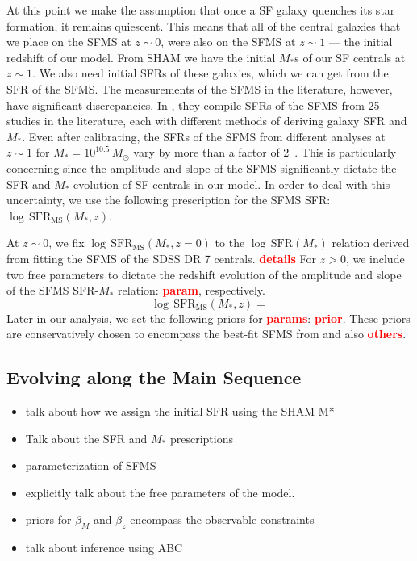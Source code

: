 \documentclass[12pt, letterpaper, preprint]{aastex}
\newcommand{\todo}[1]{{\bf \textcolor{red}{#1}}}
\newcommand{\beq}{\begin{equation}}
\newcommand{\eeq}{\end{equation}}
\newcommand{\bitem}{\begin{itemize}}
\newcommand{\eitem}{\end{itemize}}
\begin{document}
At this point we make the assumption that once a SF galaxy quenches 
its star formation, it remains quiescent. This means that all of the 
central galaxies that we place on the SFMS at $z \sim 0$, were also 
on the SFMS at $z \sim 1$ --- the initial redshift of our model. From 
SHAM we have the initial $M_*$s of our SF centrals at $z \sim 1$. We 
also need initial SFRs of these galaxies, which we can get from the 
SFR of the SFMS. The measurements of the SFMS in the literature, however,
have significant discrepancies. In \cite{speagle2014}, they compile 
SFRs of the SFMS from 25 studies in the literature, each with different 
methods of deriving galaxy SFR and $M_*$. Even after calibrating, the 
SFRs of the SFMS from different analyses at $z \sim 1$ for $M_* = 10^{10.5}\, M_\odot$ 
vary by more than a factor of 2~\citep[see Figure 2 of][]{speagle2014}. 
This is particularly concerning since the amplitude and slope of the SFMS 
significantly dictate the SFR and $M_*$ evolution of SF centrals in our 
model. In order to deal with this uncertainty, we use the following 
prescription for the SFMS SFR: $\log\,\mathrm{SFR}_\mathrm{MS}(M_*, z)$. 

At $z \sim 0$, we fix $\log\,\mathrm{SFR}_\mathrm{MS}(M_*, z=0)$ to the 
$\log\, \mathrm{SFR}(M_*)$ relation derived from fitting the SFMS 
of the SDSS DR 7 centrals. \todo{details} 
For $z > 0$, we include two free parameters to dictate the redshift
evolution of the amplitude and slope of the SFMS SFR-$M_*$ relation: 
\todo{param}, respectively. 
\beq
\log\,\mathrm{SFR}_\mathrm{MS}(M_*, z) = 
\eeq
Later in our analysis, we set the following
priors for \todo{params}: \todo{prior}. These priors are conservatively 
chosen to encompass the best-fit SFMS  from \cite{speagle2014} and also 
\todo{others}. 





\subsection{Evolving along the Main Sequence} 
\bitem
\item talk about how we assign the initial SFR using the SHAM M*
\item Talk about the SFR and $M_*$ prescriptions 
\item parameterization of SFMS 
\item explicitly talk about the free parameters of the model. 
\item priors for $\beta_M$ and $\beta_z$ encompass the observable constraints 
\item talk about inference using ABC
\eitem
\end{document}
